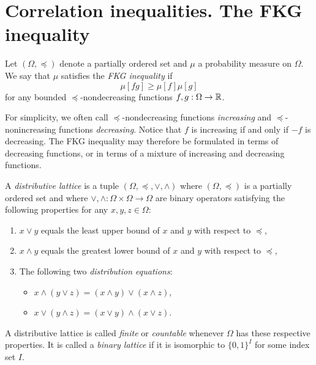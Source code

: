 \section{Correlation inequalities. The FKG inequality}

\begin{definition}
    Let $(\Omega,\preceq)$ denote a partially ordered set
    and $\mu$ a probability measure on $\Omega$.
    We say that $\mu$ satisfies the \emph{FKG inequality}
    if
    \begin{equation}
        \label{eq:FKG}
        \mu[fg]\geq \mu[f]\mu[g]
    \end{equation}
    for any bounded $\preceq$-nondecreasing functions
    $f,g:\Omega\to\mathbb R$.
\end{definition}

For simplicity, we often call $\preceq$-nondecreasing functions \emph{increasing}
and $\preceq$-nonincreasing functions \emph{decreasing}.
Notice that $f$ is increasing if and only if $-f$ is decreasing.
The FKG inequality may therefore be formulated in terms of decreasing functions,
or in terms of a mixture of increasing and decreasing functions.

\begin{definition}
    A \emph{distributive lattice} is a tuple $(\Omega,\preceq,\vee,\wedge)$
    where $(\Omega,\preceq)$ is a partially ordered set
    and where $\vee,\wedge:\Omega\times\Omega\to\Omega$
    are binary operators satisfying the following properties
    for any $x,y,z\in\Omega$:
    \begin{enumerate}
        \item $x\vee y$ equals the least upper bound of $x$ and $y$ with respect to $\preceq$,
        \item $x\wedge y$ equals the greatest lower bound of $x$ and $y$ with respect to $\preceq$,
        \item The following two \emph{distribution equations}:
        \begin{itemize}
            \item $x\wedge (y\vee z)=(x\wedge y)\vee(x\wedge z)$,
            \item $x\vee (y\wedge z)=(x\vee y)\wedge(x\vee z)$.
        \end{itemize}
    \end{enumerate}
    A distributive lattice is called \emph{finite} or \emph{countable}
    whenever $\Omega$ has these respective properties.
    It is called a \emph{binary lattice} if it is isomorphic
    to $\{0,1\}^I$ for some index set $I$.
\end{definition}


